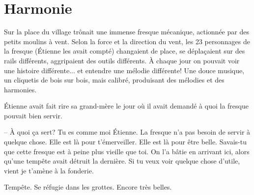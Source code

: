 \chapter{Harmonie}

Sur la place du village trônait une immense fresque mécanique, actionnée par
des petits moulins à vent.  Selon la force et la direction du vent, les 23
personnages de la fresque (Étienne les avait compté) changaient de place, se
déplaçaient sur des rails différents, aggripaient des outils différents.  À
chaque jour on pouvait voir une histoire différente... et entendre une mélodie
différente!  Une douce musique, un cliquetis de bois sur bois, mais calibré,
produisant des mélodies et des harmonies.

Étienne avait fait rire sa grand-mère le jour où il avait demandé à quoi la fresque pouvait bien servir.

-- À quoi ça sert? Tu es comme moi Étienne. La fresque n'a pas besoin de servir
à quelque chose. Elle est là pour t'émerveiller.  Elle est là pour être belle.
Savais-tu que cette fresque est à peine plus vieille que toi. On l'a bâtie en
arrivant ici, alors qu'une tempête avait détruit la dernière.  Si tu veux voir
quelque chose d'utile, vient je t'amène à la fonderie.







Tempête. Se réfugie dans les grottes. Encore très belles.


